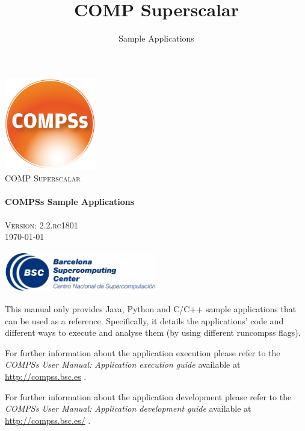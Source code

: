 \documentclass[a4paper,12pt]{article}
\title{COMP Superscalar}
\author{Sample Applications}
\def \compssversion {2.2.rc1801}
\begin{document}
  \hypersetup{pageanchor=false}
  \begin{titlepage} 
    \begin{center} 
      \includegraphics[width=0.3\textwidth]{./Figures/Logos/degradado-naranja-compss.jpg}~\\[1cm] 
      \textsc{\LARGE COMP Superscalar}\\[1.5cm] 
      
      \HRule \\[0.4cm] 
      { \huge \bfseries COMPSs Sample Applications \\[0.4cm] }
      \HRule \\[1.5cm] 

      { \large \textsc{Version: \compssversion}} \\[0.3cm]
      { \large \today } 
      
      \vfill 
      \includegraphics[width=0.5\textwidth]{./Figures/bsc_280.jpg}~\\[1cm]
    \end{center} 
  \end{titlepage}
  \hypersetup{pageanchor=true}
  
  {
    This manual only provides Java, Python and C/C++ sample applications that can be used as a reference. Specifically, it details
    the applications' code and different ways to execute and analyse them (by using different runcompss flags).
    \newline

    For further information about the application execution please refer to the \textit{COMPSs User Manual: Application execution
    guide} available at \url{http://compss.bsc.es} .
    
    For further information about the application development please refer to the \textit{COMPSs User Manual: Application development
    guide} available at \url{http://compss.bsc.es/} .

  }
  
\end{document}
